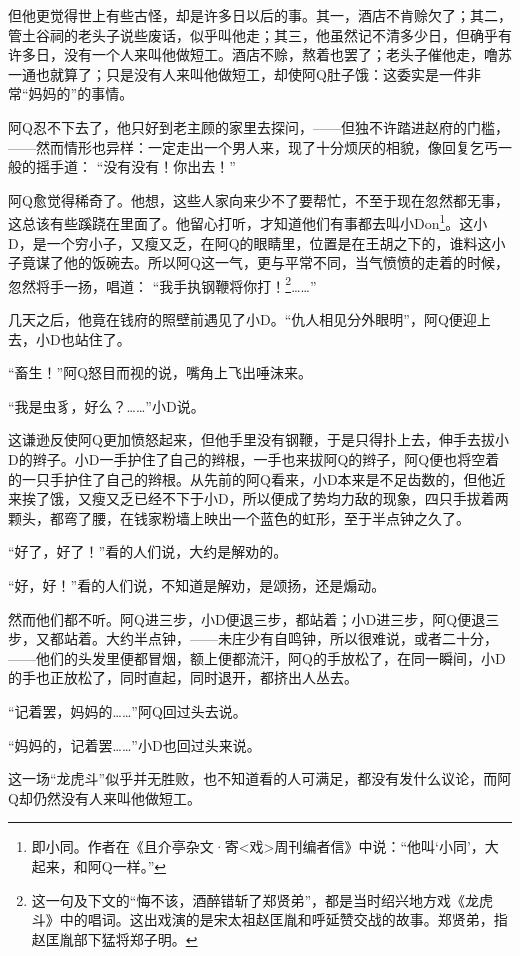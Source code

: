 \documentclass[12pt,UTF8]{ctexbook}
\begin{document}
但他更觉得世上有些古怪，却是许多日以后的事。其一，酒店不肯赊欠了；其二，管土谷祠的老头子说些废话，似乎叫他走；其三，他虽然记不清多少日，但确乎有许多日，没有一个人来叫他做短工。酒店不赊，熬着也罢了；老头子催他走，噜苏一通也就算了；只是没有人来叫他做短工，却使阿Q肚子饿：这委实是一件非常“妈妈的”的事情。

阿Q忍不下去了，他只好到老主顾的家里去探问，——但独不许踏进赵府的门槛，——然而情形也异样：一定走出一个男人来，现了十分烦厌的相貌，像回复乞丐一般的摇手道：
“没有没有！你出去！”

阿Q愈觉得稀奇了。他想，这些人家向来少不了要帮忙，不至于现在忽然都无事，这总该有些蹊跷在里面了。他留心打听，才知道他们有事都去叫小Don\footnote{即小同。作者在《且介亭杂文·寄<戏>周刊编者信》中说：“他叫‘小同’，大起来，和阿Q一样。”}。这小D，是一个穷小子，又瘦又乏，在阿Q的眼睛里，位置是在王胡之下的，谁料这小子竟谋了他的饭碗去。所以阿Q这一气，更与平常不同，当气愤愤的走着的时候，忽然将手一扬，唱道：
“我手执钢鞭将你打！\footnote{这一句及下文的“悔不该，酒醉错斩了郑贤弟”，都是当时绍兴地方戏《龙虎斗》中的唱词。这出戏演的是宋太祖赵匡胤和呼延赞交战的故事。郑贤弟，指赵匡胤部下猛将郑子明。}……”

几天之后，他竟在钱府的照壁前遇见了小D。“仇人相见分外眼明”，阿Q便迎上去，小D也站住了。

“畜生！”阿Q怒目而视的说，嘴角上飞出唾沫来。

“我是虫豸，好么？……”小D说。

这谦逊反使阿Q更加愤怒起来，但他手里没有钢鞭，于是只得扑上去，伸手去拔小D的辫子。小D一手护住了自己的辫根，一手也来拔阿Q的辫子，阿Q便也将空着的一只手护住了自己的辫根。从先前的阿Q看来，小D本来是不足齿数的，但他近来挨了饿，又瘦又乏已经不下于小D，所以便成了势均力敌的现象，四只手拔着两颗头，都弯了腰，在钱家粉墙上映出一个蓝色的虹形，至于半点钟之久了。

“好了，好了！”看的人们说，大约是解劝的。

“好，好！”看的人们说，不知道是解劝，是颂扬，还是煽动。

然而他们都不听。阿Q进三步，小D便退三步，都站着；小D进三步，阿Q便退三步，又都站着。大约半点钟，——未庄少有自鸣钟，所以很难说，或者二十分，——他们的头发里便都冒烟，额上便都流汗，阿Q的手放松了，在同一瞬间，小D的手也正放松了，同时直起，同时退开，都挤出人丛去。

“记着罢，妈妈的……”阿Q回过头去说。

“妈妈的，记着罢……”小D也回过头来说。

这一场“龙虎斗”似乎并无胜败，也不知道看的人可满足，都没有发什么议论，而阿Q却仍然没有人来叫他做短工。
\end{document}
